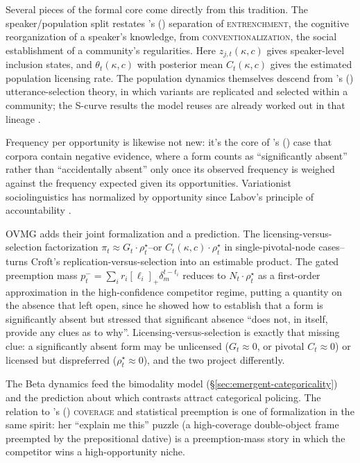 \documentclass[12pt,letterpaper]{article}
\newcommand{\term}[1]{\textsc{#1}}
\newcommand{\posscite}[1]{\citeauthor{#1}'s (\citeyear{#1})}
\begin{document}
Several pieces of the formal core come directly from this tradition. The
speaker/population split restates \posscite{schmid2020} separation of
\term{entrenchment}, the cognitive reorganization of a speaker's knowledge, from
\term{conventionalization}, the social establishment of a community's
regularities. Here $z_{j,t}(\kappa,c)$ gives speaker-level inclusion states, and
$\theta_t(\kappa,c)$ with posterior mean $C_t(\kappa,c)$ gives the estimated
population licensing rate. The population dynamics themselves descend from
\posscite{croft2000} utterance-selection theory, in which variants are
replicated and selected within a community; the S-curve results the model reuses
are already worked out in that lineage \autocite{BlytheCroft2012}.

Frequency per opportunity is likewise not new: it's the core of
\posscite{Stefanowitsch_2006_NegativeEvidence} case that corpora contain
negative evidence, where a form counts as \enquote{significantly absent} rather
than \enquote{accidentally absent} only once its observed frequency is weighed
against the frequency expected given its opportunities. Variationist
sociolinguistics has normalized by opportunity since Labov's principle of
accountability \autocite{labov1972}.

OVMG adds their joint formalization and a prediction. The
licensing-versus-selection factorization
$\pi_t\approx G_t\cdot\rho_t^\star$--or
$C_t(\kappa,c)\cdot\rho_t^\star$ in single-pivotal-node cases--turns Croft's
replication-versus-selection into an estimable product. The gated preemption mass
$p_t^-=\sum_i r_i[\ell_i]_+\delta_m^{t-t_i}$ reduces to
$N_t\cdot\rho_t^\star$ as a first-order approximation in the high-confidence
competitor regime, putting a
quantity on the absence that \citeauthor{Stefanowitsch_2006_NegativeEvidence}
left open, since he showed how to establish that a form is significantly absent
but stressed that significant absence \enquote{does not, in itself, provide any
clues as to why}. Licensing-versus-selection is exactly that missing clue: a
significantly absent form may be unlicensed ($G_t\approx0$, or pivotal
$C_t\approx0$) or licensed but dispreferred ($\rho_t^\star\approx0$), and the two
project differently.

The Beta dynamics feed the bimodality model (\S\ref{sec:emergent-categoricality}) and the prediction about which contrasts attract categorical policing. The relation to \posscite{goldberg2019} \term{coverage} and statistical preemption is one of formalization in the same spirit: her \enquote{explain me this} puzzle (a high-coverage double-object frame preempted by the prepositional dative) is a preemption-mass story in which the competitor wins a high-opportunity niche.
\end{document}
